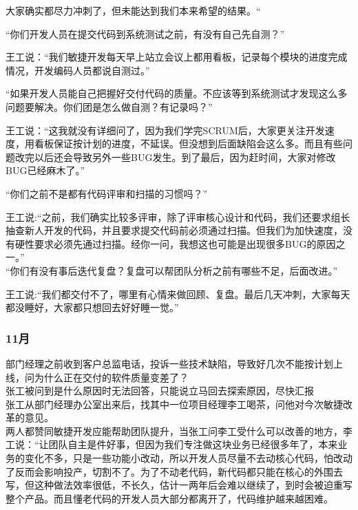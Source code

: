 大家确实都尽力冲刺了，但未能达到我们本来希望的结果。``

“你们开发人员在提交代码到系统测试之前，有没有自己先自测？”

王工说：“我们敏捷开发每天早上站立会议上都用看板，记录每个模块的进度完成情况，开发编码人员都说自测过。”

“如果开发人员能自己把握好交付代码的质量。不应该等到系统测试才发现这么多问题要解决。你们团是怎么做自测？有记录吗？”

王工说：“这我就没有详细问了，因为我们学完SCRUM后，大家更关注开发速度，用看板保证按计划的进度，不延误。但没想到后面缺陷会这么多。而且有些问题改完以后还会导致另外一些BUG发生。到了最后，因为赶时间，大家对修改BUG已经麻木了。”

“你们之前不是都有代码评审和扫描的习惯吗？”

王工说:“之前，我们确实比较多评审，除了评审核心设计和代码，我们还要求组长抽查新人开发的代码，并且要求提交代码前必须通过扫描。但我们为加快速度，没有硬性要求必须先通过扫描。经你一问，我想这也可能是出现很多BUG的原因之一。”\\

“你们有没有事后迭代复盘？复盘可以帮团队分析之前有哪些不足，后面改进。”

王工说:“我们都交付不了，哪里有心情来做回顾、复盘。最后几天冲刺，大家每天都没睡好，大家都只想回去好好睡一觉。”


\hypertarget{ux6708-4}{%
\subsubsection{11月}\label{ux6708-4}}

部门经理之前收到客户总监电话，投诉一些技术缺陷，导致好几次不能按计划上线，问为什么正在交付的软件质量变差了？\\
张工被问到是什么原因时无法回答，只能说立马回去探索原因，尽快汇报\\

张工从部门经理办公室出来后，找其中一位项目经理李工喝茶，问他对今次敏捷改革的意见。\\

两人都赞同敏捷开发应能帮助团队提升，当张工问李工受什么可以改善的地方，李工说：“让团队自主是件好事，但因为我们专注做这块业务已经很多年了，本来业务的变化不多，只是一些功能小改动，所以开发人员尽量不去动核心代码，怕改动了反而会影响投产，切割不了。为了不动老代码，新代码都只能在核心的外围去写，但这种做法效率很低，不长久，估计一两年后会难以继续了，到时会被迫重写整个产品。而且懂老代码的开发人员大部分都离开了，代码维护越来越困难。

